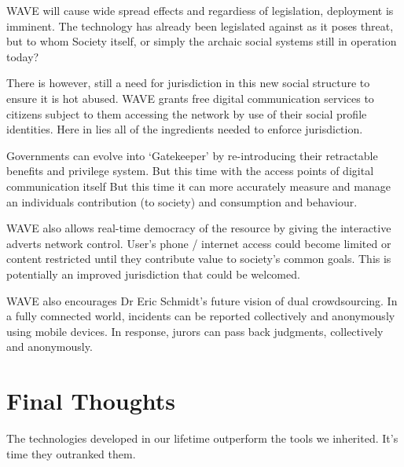 \documentclass[letterpaper,10pt,openany,oneside,english]{sphinxmanual}
\begin{document}
WAVE will cause wide spread effects and regardiess of legislation, deployment is imminent. The technology has already been legislated against as it poses threat, but to whom Society itself, or simply the archaic social systems still in operation today?

There is however, still a need for jurisdiction in this new social structure to ensure it is hot abused. WAVE grants free digital communication services to citizens subject to them accessing the network by use of their social profile identities. Here in lies all of the ingredients needed to enforce jurisdiction.

Governments can evolve into ‘Gatekeeper’ by re-introducing their retractable benefits and privilege system. But this time with the access points of digital communication itself But this time it can more accurately measure and manage an individuals contribution (to society) and consumption and behaviour.

WAVE also allows real-time democracy of the resource by giving the interactive adverts network control. User’s phone / internet access could become limited or content restricted until they contribute value to society’s common goals. This is potentially an improved jurisdiction that could be welcomed.

WAVE also encourages Dr Eric Schmidt’s future vision of dual crowdsourcing. In a fully comnected world, incidents can be reported collectively and anonymously using mobile devices. In response, jurors can pass back judgments, collectively and anonymously.


\chapter{Final Thoughts}
\label{\detokenize{final-thoughts:final-thoughts}}\label{\detokenize{final-thoughts::doc}}
The technologies developed in our lifetime outperform the tools we inherited.
It’s time they outranked them.


\chapter{}
\label{\detokenize{index:document-author-s}}



\renewcommand{\indexname}{Index}
\printindex
\end{document}
